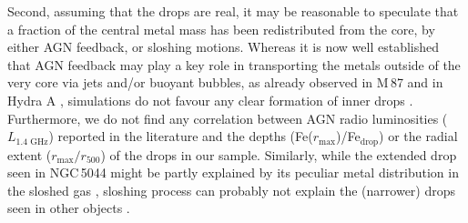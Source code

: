 \documentclass{aa}
\begin{document}
Second, assuming that the drops are real, it may be reasonable to speculate that a fraction of the central metal mass has been redistributed from the core, by either AGN feedback, or sloshing motions. Whereas it is now well established that AGN feedback may play a key role in transporting the metals outside of the very core via jets and/or buoyant bubbles, as already observed in M\,87 \citep{2008A&A...482...97S} and in Hydra A \citep{2009A&A...493..409S}, simulations do not favour any clear formation of inner drops \citep[e.g.][]{2010ApJ...717..937G}. Furthermore, we do not find any correlation between AGN radio luminosities ($L_\text{1.4 GHz}$) reported in the literature \citep[e.g.][]{2012MNRAS.427.3468B} and the depths (Fe($r_\text{max}$)/Fe$_\text{drop}$) or the radial extent ($r_\text{max}/r_{500}$) of the drops in our sample. Similarly, while the extended drop seen in NGC\,5044 might be partly explained by its peculiar metal distribution in the sloshed gas \citep{2014MNRAS.437..730O}, sloshing process can probably not explain the (narrower) drops seen in other objects \citep{2011MNRAS.413.2057R,2012MNRAS.420.3632R}.
\end{document}
